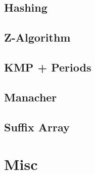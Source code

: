		\subsection{Hashing}
			
		\subsection{Z-Algorithm}
			
		\subsection{KMP + Periods}
			
		\subsection{Manacher}
			
		\subsection{Suffix Array}
			
	\section{Misc}
